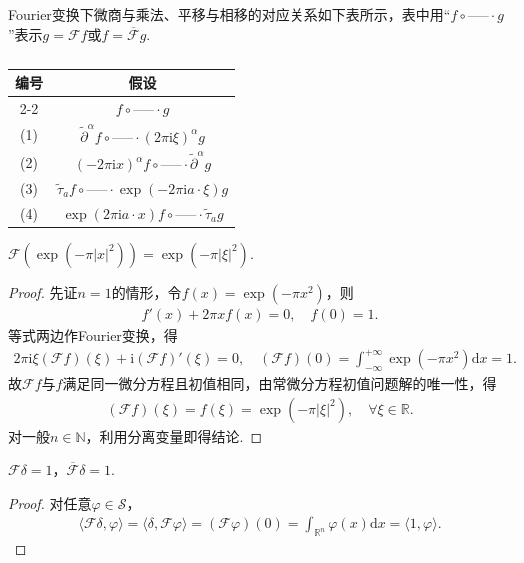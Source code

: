 \documentclass[../../main.tex]{subfiles}%
\begin{document}
\begin{remark}
Fourier变换下微商与乘法、平移与相移的对应关系如下表所示，表中用“$f \circ \text{-----} \cdot g$”表示$g=\mathscr{F}f$或$f=\overline{\mathscr{F}}g$.
\begin{table}[H]
\centering
\caption{}
\begin{tabular}{c|c}
\hline
编号 & 假设 \\
\cline{2-2}
& $f \circ \text{-----} \cdot g$ \\
\hline
(1) & $\widetilde{\partial}^\alpha f \circ \text{-----} \cdot (2\pi\mathrm{i}\xi)^\alpha g$ \\
\hline
(2) & $(-2\pi\mathrm{i}x)^\alpha f \circ \text{-----} \cdot \widetilde{\partial}^\alpha g$ \\
\hline
(3) & $\widetilde{\tau}_a f \circ \text{-----} \cdot \exp(-2\pi\mathrm{i}a\cdot\xi)g$ \\
\hline
(4) & $\exp(2\pi\mathrm{i}a\cdot x)f \circ \text{-----} \cdot \widetilde{\tau}_a g$ \\
\hline
\end{tabular}
\end{table}

\end{remark}

\begin{proposition}
$\mathscr{F}(\exp(-\pi|x|^2))=\exp(-\pi|\xi|^2)$.
\end{proposition}
\begin{proof}

先证$n=1$的情形，令$f(x)=\exp(-\pi x^2)$，则
\begin{align*}
f'(x)+2\pi x f(x)=0,\quad f(0)=1.
\end{align*}
等式两边作Fourier变换，得
\begin{align*}
2\pi\mathrm{i}\xi(\mathscr{F}f)(\xi)+\mathrm{i}(\mathscr{F}f)'(\xi)=0,\quad (\mathscr{F}f)(0)=\int_{-\infty}^{+\infty}\exp(-\pi x^2)\mathrm{d}x=1.
\end{align*}
故$\mathscr{F}f$与$f$满足同一微分方程且初值相同，由常微分方程初值问题解的唯一性，得
\begin{align*}
(\mathscr{F}f)(\xi)=f(\xi)=\exp(-\pi|\xi|^2),\quad \forall\xi\in\mathbb{R}.
\end{align*}
对一般$n\in\mathbb{N}$，利用分离变量即得结论.

\end{proof}

\begin{proposition}
$\mathscr{F}\delta=1$，$\overline{\mathscr{F}}\delta=1$.
\end{proposition}
\begin{proof}

对任意$\varphi\in\mathscr{S}$，
\begin{align*}
\langle\mathscr{F}\delta,\varphi\rangle=\langle\delta,\mathscr{F}\varphi\rangle=(\mathscr{F}\varphi)(0)=\int_{\mathbb{R}^n}\varphi(x)\mathrm{d}x=\langle1,\varphi\rangle.
\end{align*}

\end{proof}
\end{document}
